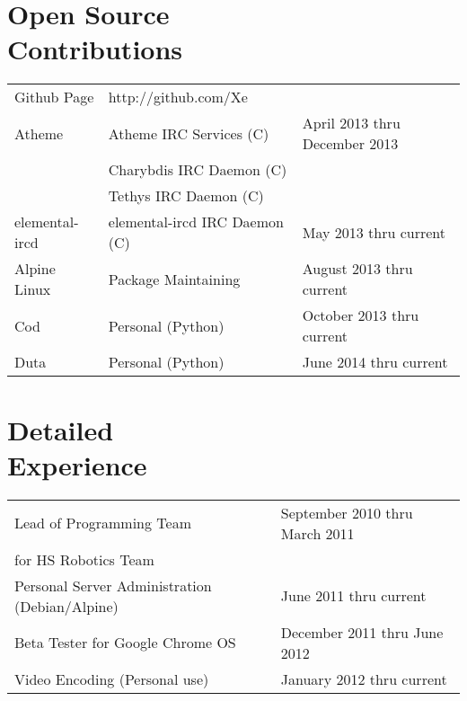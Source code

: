 \documentclass[line, margin]{res}
\begin{document}
\address{+1 (425) 221-7761}

\begin{resume}

	\section{Open Source \\ Contributions}
	\begin{tabular}{l l l}
		Github Page & \hfill http://github.com/Xe & \\ [5pt]
		Atheme & \hfill Atheme IRC Services (C) & \hfill April 2013 thru December 2013 \\ 
	 & \hfill Charybdis IRC Daemon (C) \\
	 & \hfill Tethys IRC Daemon (C) \\
		elemental-ircd & \hfill elemental-ircd IRC Daemon (C) & \hfill May 2013 thru current \\
		Alpine Linux & \hfill Package Maintaining & \hfill August 2013 thru current \\
		Cod & \hfill Personal (Python) & \hfill October 2013 thru current \\
		Duta & \hfill Personal (Python) & \hfill June 2014 thru current
	\end{tabular}

	\section{Detailed \\ Experience}
	\begin{tabular}{l l}
		Lead of Programming Team & \hfill September 2010 thru March 2011 \\ 
		for HS Robotics Team & \\
		Personal Server Administration (Debian/Alpine) & \hfill June 2011 thru current  \\
		Beta Tester for Google Chrome OS & \hfill December 2011 thru June 2012 \\
		Video Encoding (Personal use) & January 2012 thru current \\
	\end{tabular}


\end{resume}
\end{document}
